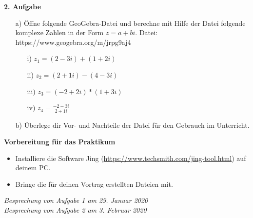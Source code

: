 \documentclass[a4paper,11pt]{scrreprt} %
\theoremstyle{definition} %
\begin{document}

\textbf{2. Aufgabe}
\begin{enumerate}
    \item[a)] Öffne folgende GeoGebra-Datei und berechne mit Hilfe der Datei folgende komplexe Zahlen in der
    Form $z = a + bi$.
    Datei: https://www.geogebra.org/m/jrpg9aj4
    \begin{enumerate}
     \item[i)]  $z_1=(2-3i) + (1+2i)$
     \item[ii)]  $z_2=(2+1i) - (4-3i)$
     \item[iii)]  $z_3=(-2+2i)*(1+3i)$
     \item[iv)]  $z_4=\frac{-2-3i}{2+1i}$
    \end{enumerate}

    \item[b)] Überlege dir Vor- und Nachteile der Datei für den Gebrauch im Unterricht.
\end{enumerate}

 


 \vspace{3ex}

\textbf{Vorbereitung für das Praktikum}
\begin{itemize}
    \item Installiere die Software Jing (\url{https://www.techsmith.com/jing-tool.html}) auf deinem PC.
    \item Bringe die für deinen Vortrag erstellten Dateien mit.
\end{itemize}




\vspace*{\fill} %

\begin{flushright}
\textit{Besprechung von Aufgabe 1 am 29. Januar 2020\\
        Besprechung von Aufgabe 2 am 3. Februar 2020}
\end{flushright}
\end{document}
